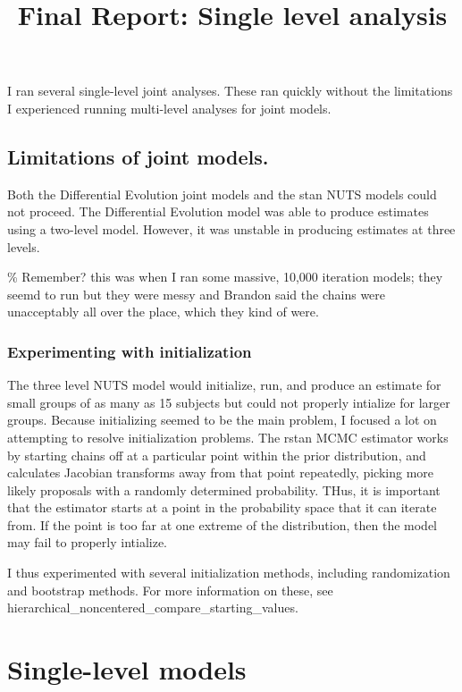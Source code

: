 \documentclass[]{article}
\title{Final Report: Single level analysis}
\author{}
\date{}
\begin{document}
\maketitle

I ran several single-level joint analyses. These ran quickly without the
limitations I experienced running multi-level analyses for joint models.

\subsection{Limitations of joint
models.}\label{limitations-of-joint-models.}

Both the Differential Evolution joint models and the stan NUTS models
could not proceed. The Differential Evolution model was able to produce
estimates using a two-level model. However, it was unstable in producing
estimates at three levels.

\% Remember? this was when I ran some massive, 10,000 iteration models;
they seemd to run but they were messy and Brandon said the chains were
unacceptably all over the place, which they kind of were.

\subsubsection{Experimenting with
initialization}\label{experimenting-with-initialization}

The three level NUTS model would initialize, run, and produce an
estimate for small groups of as many as 15 subjects but could not
properly intialize for larger groups. Because initializing seemed to be
the main problem, I focused a lot on attempting to resolve
initialization problems. The rstan MCMC estimator works by starting
chains off at a particular point within the prior distribution, and
calculates Jacobian transforms away from that point repeatedly, picking
more likely proposals with a randomly determined probability. THus, it
is important that the estimator starts at a point in the probability
space that it can iterate from. If the point is too far at one extreme
of the distribution, then the model may fail to properly intialize.

I thus experimented with several initialization methods, including
randomization and bootstrap methods. For more information on these, see
hierarchical\_noncentered\_compare\_starting\_values.

\section{Single-level models}\label{single-level-models}
\end{document}
